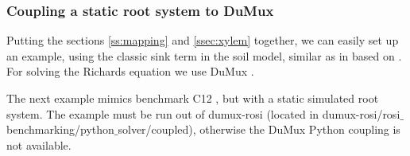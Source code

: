 
\subsubsection*{Coupling a static root system to DuMux} \label{sec:dumux_coupling}

Putting the sections \ref{ss:mapping} and \ref{ssec:xylem} together, we can easily set up an example, using the classic sink term in the soil model, similar as in \citep{leitner2014impact} based on \citep{doussan1998modelling}. For solving the Richards equation we use DuMux \citep{koch2020dumux}.

The next example mimics benchmark C12 \citep{schnepf2019call}, but with a static simulated root system. The example must be run out of dumux-rosi (located in dumux-rosi/rosi$\_$benchmarking/python$\_$solver/coupled), otherwise the DuMux Python coupling is not available. 



